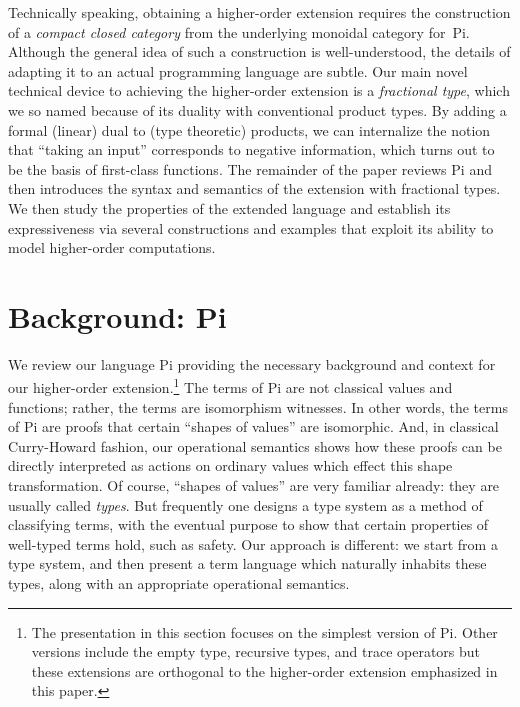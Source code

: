 \documentclass{llncs}
\newcommand{\roshan}[1]{\textsc{Roshan says:} 
  \textit{#1}
}
\begin{document}
Technically speaking, obtaining a higher-order extension requires the
construction of a \emph{compact closed category} from the underlying monoidal
category for~{{Pi}}. Although the general idea of such a construction is
well-understood, the details of adapting it to an actual programming language
are subtle.  Our main novel
technical device to achieving the higher-order extension is a
\emph{fractional type}, which we so named because of its duality with
conventional product types.  By adding a formal (linear) dual to (type
theoretic) products, we can internalize the notion that ``taking an input''
corresponds to negative information, which turns out to be the basis of
first-class functions. The remainder of the paper reviews {{Pi}} and then
introduces the syntax and semantics of the extension with fractional
types. We then study the properties of the extended language and establish
its expressiveness via several constructions and examples that exploit its
ability to model higher-order computations.


\section{Background: {{Pi}} }
\label{sec:pi}

We review our language {{Pi}} providing the necessary background and
context for our higher-order extension.\footnote{The presentation in this
  section focuses on the simplest version of {{Pi}}. Other versions
  include the empty type, recursive types, and trace operators but these
  extensions are orthogonal to the higher-order extension emphasized in this
  paper.} The terms of {{Pi}} are not classical values and functions;
rather, the terms are isomorphism witnesses.  In other words, the terms of
{{Pi}} are proofs that certain ``shapes of values'' are isomorphic.
And, in classical Curry-Howard fashion, our operational semantics shows how
these proofs can be directly interpreted as actions on ordinary values which
effect this shape transformation. Of course, ``shapes of values'' are very
familiar already: they are usually called \emph{types}.  But frequently one
designs a type system as a method of classifying terms, with the eventual
purpose to show that certain properties of well-typed terms hold, such as
safety.  Our approach is different: we start from a type system, and then
present a term language which naturally inhabits these types, along with an
appropriate operational semantics.
\end{document}
